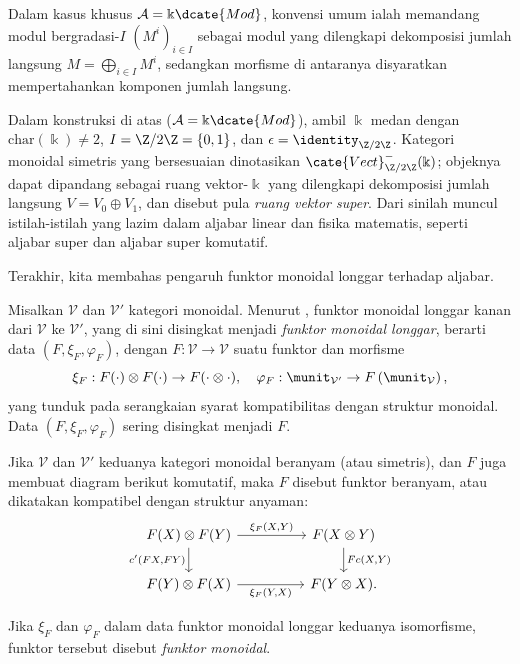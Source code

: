 \begin{konvensi}
	Dalam kasus khusus $\mathcal{A}=\Bbbk\dcate{Mod}$, konvensi umum ialah
	memandang modul bergradasi-$I$ $(M^i)_{i\in I}$ sebagai modul yang dilengkapi
	dekomposisi jumlah langsung $M=\bigoplus_{i\in I}M^i$, sedangkan morfisme di
	antaranya disyaratkan mempertahankan komponen jumlah langsung.
\end{konvensi}

\begin{contoh}\label{eg:superspace}
	Dalam konstruksi di atas ($\mathcal{A}=\Bbbk\dcate{Mod}$), ambil $\Bbbk$
	medan dengan $\mathrm{char}(\Bbbk)\neq2$,
	$I=\Z/2\Z=\{0,1\}$, dan $\epsilon=\identity_{\Z/2\Z}$. Kategori monoidal
	simetris yang bersesuaian dinotasikan
	$\cate{Vect}^-_{\Z/2\Z}(\Bbbk)$; objeknya dapat dipandang sebagai ruang
	vektor-$\Bbbk$ yang dilengkapi dekomposisi jumlah langsung
	$V=V_0\oplus V_1$, dan disebut pula \emph{ruang vektor super}. Dari sinilah
	muncul istilah-istilah yang lazim dalam aljabar linear dan fisika matematis,
	seperti aljabar super dan aljabar super komutatif.
\end{contoh}

Terakhir, kita membahas pengaruh funktor monoidal longgar terhadap aljabar.

\begin{definisi}\label{def:lax-monoidal}
	Misalkan $\mathcal{V}$ dan $\mathcal{V}'$ kategori monoidal. Menurut
	\cite[Catatan 3.1.8]{Li1}, funktor monoidal longgar kanan dari $\mathcal{V}$
	ke $\mathcal{V}'$, yang di sini disingkat menjadi \emph{funktor monoidal
	longgar}, berarti data $(F,\xi_F,\varphi_F)$, dengan
	$F:\mathcal{V}\to\mathcal{V}$ suatu funktor dan morfisme
	\[ \xi_F: F(\cdot) \otimes F(\cdot) \to F(\cdot \otimes \cdot), \quad \varphi_F: \munit_{\mathcal{V}'} \to F\left( \munit_{\mathcal{V}} \right), \]
	yang tunduk pada serangkaian syarat kompatibilitas dengan struktur monoidal.
	Data $(F,\xi_F,\varphi_F)$ sering disingkat menjadi $F$.
	
	Jika $\mathcal{V}$ dan $\mathcal{V}'$ keduanya kategori monoidal beranyam
	(atau simetris), dan $F$ juga membuat diagram berikut komutatif, maka $F$
	disebut funktor beranyam, atau dikatakan kompatibel dengan struktur anyaman:
	\[\begin{tikzcd}[column sep=huge]
		F(X) \otimes F(Y) \arrow[r, "{\xi_F(X, Y)}"] \arrow[d, "{c'(FX, FY)}"'] & F(X \otimes Y) \arrow[d, "{Fc(X, Y)}"] \\
		F(Y) \otimes F(X) \arrow[r, "{\xi_F(Y, X)}"'] & F(Y \otimes X) .
	\end{tikzcd}\]

	Jika $\xi_F$ dan $\varphi_F$ dalam data funktor monoidal longgar keduanya
	isomorfisme, funktor tersebut disebut \emph{funktor monoidal}.
\end{definisi}

